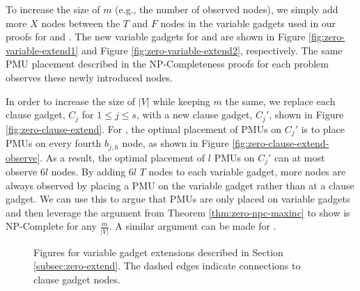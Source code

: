 To increase the size of $m$ (e.g., the number of observed nodes), we simply add more $X$ nodes between the $T$ and $F$ nodes in the variable gadgets used in our proofs for \xvalpart and \maxincs. 
The new variable gadgets for \maxinc and \xvalpart are shown in Figure \ref{fig:zero-variable-extend1} and Figure \ref{fig:zero-variable-extend2}, respectively.
The same PMU placement described in the NP-Completeness proofs for each problem observes these newly introduced nodes.

In order to increase the size of $|V|$ while keeping $m$ the same, we replace each clause gadget, $C_j$ for $1 \leq j \leq s$, with a new clause gadget, $C_j'$,
shown in Figure \ref{fig:zero-clause-extend}. 
For \maxincs, the optimal placement of PMUs on $C_j'$ is to place PMUs on every fourth $b_{j,h}$ node, as shown in Figure \ref{fig:zero-clause-extend-observe}. 
As a result, the optimal placement of $l$ PMUs on $C_j'$ can at most observe $6l$ nodes.  By adding $6l$ $T$ nodes to each variable gadget, more nodes 
are always observed by placing a PMU on the variable gadget rather than at a clause gadget. We can use this to argue that PMUs are only placed on variable gadgets and then leverage the 
argument from Theorem \ref{thm:zero-npc-maxinc} to show \maxinc is NP-Complete for any $\frac{m}{|V|}$. A similar argument can be made for \xvalparts.

\begin{figure}[t]
  \begin{center}
  \end{center}
	\caption{Figures for variable gadget extensions described in Section \ref{subsec:zero-extend}. The dashed edges indicate connections to clause gadget nodes. }
  \label{fig:zero-clause-extended}
\end{figure}


